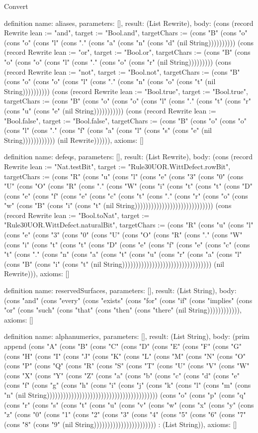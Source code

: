 \begin{lexlean}{Convert}
\begin{semanticmodule}
definition{
  name: aliases,
  parameters: [],
  result: (List Rewrite),
  body: (cons (record Rewrite {lean := "and", target := "Bool.and", targetChars := (cons "B" (cons "o" (cons "o" (cons "l" (cons "." (cons "a" (cons "n" (cons "d" (nil String)))))))))}) (cons (record Rewrite {lean := "or", target := "Bool.or", targetChars := (cons "B" (cons "o" (cons "o" (cons "l" (cons "." (cons "o" (cons "r" (nil String))))))))}) (cons (record Rewrite {lean := "not", target := "Bool.not", targetChars := (cons "B" (cons "o" (cons "o" (cons "l" (cons "." (cons "n" (cons "o" (cons "t" (nil String)))))))))}) (cons (record Rewrite {lean := "Bool.true", target := "Bool.true", targetChars := (cons "B" (cons "o" (cons "o" (cons "l" (cons "." (cons "t" (cons "r" (cons "u" (cons "e" (nil String))))))))))}) (cons (record Rewrite {lean := "Bool.false", target := "Bool.false", targetChars := (cons "B" (cons "o" (cons "o" (cons "l" (cons "." (cons "f" (cons "a" (cons "l" (cons "s" (cons "e" (nil String)))))))))))}) (nil Rewrite)))))),
  axioms: []
}

definition{
  name: defeqs,
  parameters: [],
  result: (List Rewrite),
  body: (cons (record Rewrite {lean := "Nat.testBit", target := "Rule30UOR.WittDefect.rowBit", targetChars := (cons "R" (cons "u" (cons "l" (cons "e" (cons "3" (cons "0" (cons "U" (cons "O" (cons "R" (cons "." (cons "W" (cons "i" (cons "t" (cons "t" (cons "D" (cons "e" (cons "f" (cons "e" (cons "c" (cons "t" (cons "." (cons "r" (cons "o" (cons "w" (cons "B" (cons "i" (cons "t" (nil String))))))))))))))))))))))))))))}) (cons (record Rewrite {lean := "Bool.toNat", target := "Rule30UOR.WittDefect.naturalBit", targetChars := (cons "R" (cons "u" (cons "l" (cons "e" (cons "3" (cons "0" (cons "U" (cons "O" (cons "R" (cons "." (cons "W" (cons "i" (cons "t" (cons "t" (cons "D" (cons "e" (cons "f" (cons "e" (cons "c" (cons "t" (cons "." (cons "n" (cons "a" (cons "t" (cons "u" (cons "r" (cons "a" (cons "l" (cons "B" (cons "i" (cons "t" (nil String))))))))))))))))))))))))))))))))}) (nil Rewrite))),
  axioms: []
}

definition{
  name: reservedSurfaces,
  parameters: [],
  result: (List String),
  body: (cons "and" (cons "every" (cons "exists" (cons "for" (cons "if" (cons "implies" (cons "or" (cons "such" (cons "that" (cons "then" (cons "there" (nil String)))))))))))),
  axioms: []
}

definition{
  name: alphanumerics,
  parameters: [],
  result: (List String),
  body: (prim append (cons "A" (cons "B" (cons "C" (cons "D" (cons "E" (cons "F" (cons "G" (cons "H" (cons "I" (cons "J" (cons "K" (cons "L" (cons "M" (cons "N" (cons "O" (cons "P" (cons "Q" (cons "R" (cons "S" (cons "T" (cons "U" (cons "V" (cons "W" (cons "X" (cons "Y" (cons "Z" (cons "a" (cons "b" (cons "c" (cons "d" (cons "e" (cons "f" (cons "g" (cons "h" (cons "i" (cons "j" (cons "k" (cons "l" (cons "m" (cons "n" (nil String))))))))))))))))))))))))))))))))))))))))) (cons "o" (cons "p" (cons "q" (cons "r" (cons "s" (cons "t" (cons "u" (cons "v" (cons "w" (cons "x" (cons "y" (cons "z" (cons "0" (cons "1" (cons "2" (cons "3" (cons "4" (cons "5" (cons "6" (cons "7" (cons "8" (cons "9" (nil String))))))))))))))))))))))) : (List String)),
  axioms: []
}


\end{semanticmodule}
\end{lexlean}
